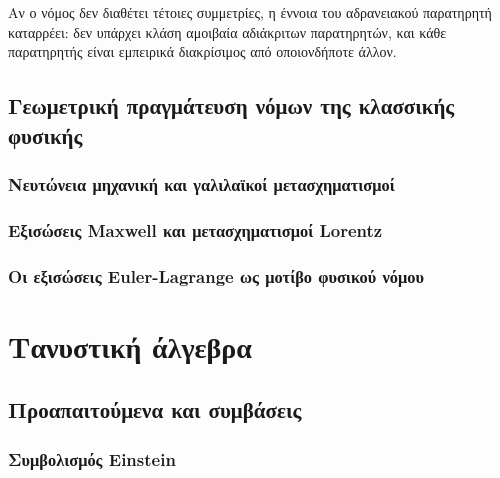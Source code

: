 \documentclass[11pt,a4paper,twoside,openright]{book}
\begin{document}
Αν ο νόμος δεν διαθέτει τέτοιες συμμετρίες, η έννοια του αδρανειακού παρατηρητή καταρρέει: δεν υπάρχει κλάση αμοιβαία αδιάκριτων παρατηρητών, και κάθε παρατηρητής είναι εμπειρικά διακρίσιμος από οποιονδήποτε άλλον.

\section{Γεωμετρική πραγμάτευση νόμων της κλασσικής φυσικής}

\subsection{Νευτώνεια μηχανική και γαλιλαϊκοί μετασχηματισμοί}

\subsection{Εξισώσεις Maxwell και μετασχηματισμοί Lorentz}

\subsection{Οι εξισώσεις Euler-Lagrange ως μοτίβο φυσικού νόμου}

\chapter{Τανυστική άλγεβρα}
	\label{chapter:tensor-algebra}

\section{Προαπαιτούμενα και συμβάσεις}
	\label{sec:general-tensor-calculus}

\subsection{Συμβολισμός Einstein}
	\label{sec:einstein-notation}
\end{document}
